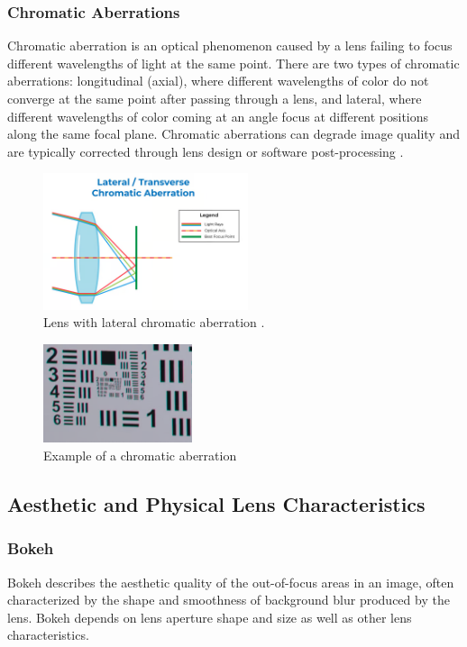 \subsubsection{Chromatic Aberrations}
Chromatic aberration is an optical phenomenon caused by a lens failing to focus different wavelengths of light at the same point. There are two types of chromatic aberrations: longitudinal (axial), where different wavelengths of color do not converge at the same point after passing through a lens, and lateral, where different wavelengths of color coming at an angle focus at different positions along the same focal plane. Chromatic aberrations can degrade image quality and are typically corrected through lens design or software post-processing \cite{ChromaticAberation}.

\begin{figure}[h]
\centering
\includegraphics[height=4cm]{Images/chromatic_aberation.png}
\caption{Lens with lateral chromatic aberration \cite{ChromaticAberation}.}
\label{fig:chrom_ab}
\end{figure}

\begin{figure}[h]
\centering
\includegraphics[height=2.9cm]{Images/chromatic_aberation_photo.png}
\caption{Example of a chromatic aberration \cite{ChromaticAberation}}
\label{fig:chrom_ab}
\end{figure}

\subsection{Aesthetic and Physical Lens Characteristics}

\subsubsection{Bokeh}
Bokeh describes the aesthetic quality of the out-of-focus areas in an image, often characterized by the shape and smoothness of background blur produced by the lens. Bokeh depends on lens aperture shape and size as well as other lens characteristics.

